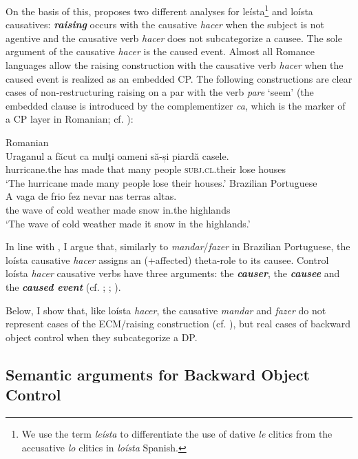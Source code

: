 \documentclass[output=paper]{langsci/langscibook}
\begin{document}
On the basis of this, \citet{Torrego2010} proposes two different analyses for leísta\footnote{We use the term \textit{leísta} to differentiate the use of dative \textit{le} clitics from the accusative \textit{lo} clitics in \textit{loísta} Spanish.} and loísta causatives: \textbf{\textit{raising}} occurs with the causative \textit{hacer} when the subject is not agentive and the causative verb \textit{hacer} does not subcategorize a causee. The sole argument of the causative \textit{hacer} is the caused event. Almost all Romance languages allow the raising construction with the causative verb \textit{hacer} when the caused event is realized as an embedded CP. The following constructions are clear cases of non-restructuring raising on a par with the verb \textit{pare} ‘seem’ (the embedded clause is introduced by the complementizer \textit{ca}, which is the marker of a CP layer in Romanian; cf. \citealt{Alboiu2007}):

\ea%
    \label{ex:moreno:8}
    \ea  Romanian\\
    \gll Uraganul    a    făcut   ca   mulţi  oameni  să-și              piardă casele.   \\
         hurricane.the has made  that many people   \textsc{subj.cl}.their lose     houses \\
    \glt ‘The hurricane made many people lose their houses.’
    \ex  Brazilian Portuguese\\
    \gll A   vaga  de frio     fez   nevar   nas     terras altas.  \\
         the wave of cold weather   made  snow  in.the highlands\\
    \glt ‘The wave of cold weather made it snow in the highlands.’ 
    \z
\z

In line with \citet{López2001}, I argue that, similarly to \textit{mandar}/\textit{fazer} in Brazilian Portuguese, the loísta causative \textit{hacer} assigns an (+affected) theta-role to its causee. Control loísta \textit{hacer} causative verbs have three arguments: the \textbf{\textit{causer}}, the \textbf{\textit{causee} }and the \textbf{\textit{caused event}} (cf. \citealt{Zubizarreta1985}; \citealt{Alsina1992}; \citealt{Ippolito2000}). 

Below, I show that, like loísta \textit{hacer}, the causative \textit{mandar} and \textit{fazer} do not represent cases of the ECM\slash raising construction (cf. \citealt{Farrell1995}), but real cases of backward object control when they subcategorize a DP.

\subsection{Semantic arguments for Backward Object Control} %
\end{document}
